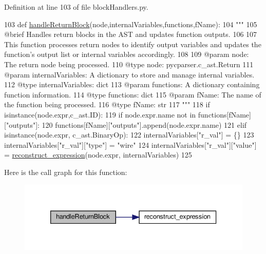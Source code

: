 Definition at line 103 of file block\+Handlers.\+py.


\begin{DoxyCode}
103 \textcolor{keyword}{def }\hyperlink{namespaceblockHandlers_a9a619208834c3d0aa0861354376f5208}{handleReturnBlock}(node,internalVariables,functions,fName):
104     \textcolor{stringliteral}{"""
}
105 \textcolor{stringliteral}{    @brief Handles return blocks in the AST and updates function outputs.
}
106 \textcolor{stringliteral}{
}
107 \textcolor{stringliteral}{    This function processes return nodes to identify output variables and updates the function's output
       list or internal variables accordingly.
}
108 \textcolor{stringliteral}{
}
109 \textcolor{stringliteral}{    @param node: The return node being processed.
}
110 \textcolor{stringliteral}{    @type node: pycparser.c\_ast.Return
}
111 \textcolor{stringliteral}{    @param internalVariables: A dictionary to store and manage internal variables.
}
112 \textcolor{stringliteral}{    @type internalVariables: dict
}
113 \textcolor{stringliteral}{    @param functions: A dictionary containing function information.
}
114 \textcolor{stringliteral}{    @type functions: dict
}
115 \textcolor{stringliteral}{    @param fName: The name of the function being processed.
}
116 \textcolor{stringliteral}{    @type fName: str
}
117 \textcolor{stringliteral}{    """}
118     \textcolor{keywordflow}{if} isinstance(node.expr,c\_ast.ID):
119         \textcolor{keywordflow}{if} node.expr.name \textcolor{keywordflow}{not} \textcolor{keywordflow}{in} functions[fName][\textcolor{stringliteral}{"outputs"}]:
120             functions[fName][\textcolor{stringliteral}{"outputs"}].append(node.expr.name)
121     \textcolor{keywordflow}{elif} isinstance(node.expr, c\_ast.BinaryOp):
122         internalVariables[\textcolor{stringliteral}{"r\_val"}] = \{\}
123         internalVariables[\textcolor{stringliteral}{"r\_val"}][\textcolor{stringliteral}{"type"}] = \textcolor{stringliteral}{"wire"}
124         internalVariables[\textcolor{stringliteral}{"r\_val"}][\textcolor{stringliteral}{"value"}] = \hyperlink{namespaceblockHandlers_a5dcb5985c58176982a44686f616daa7f}{reconstruct\_expression}(node.expr,
      internalVariables)
125 
\end{DoxyCode}
Here is the call graph for this function\+:\nopagebreak
\begin{figure}[H]
\begin{center}
\leavevmode
\includegraphics[width=333pt]{namespaceblockHandlers_a9a619208834c3d0aa0861354376f5208_cgraph}
\end{center}
\end{figure}
